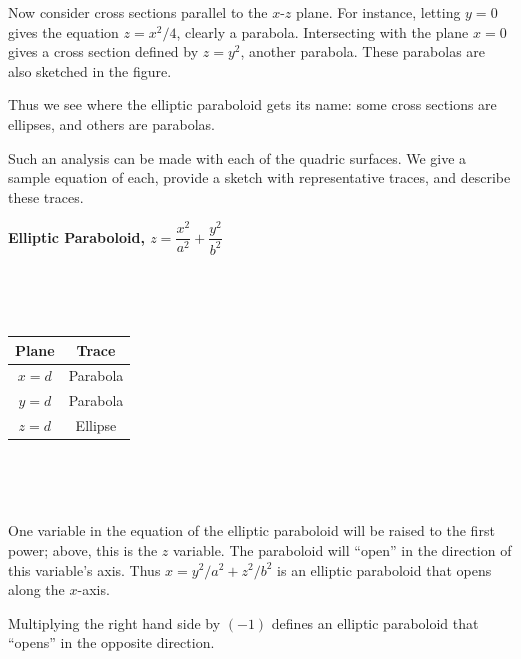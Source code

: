 Now consider cross sections parallel to the $x$-$z$ plane. For instance, letting $y=0$ gives the equation $z=x^2/4$, clearly a parabola. Intersecting with the plane $x=0$ gives a cross section defined by $z=y^2$, another parabola. These parabolas are also sketched in the figure. 

Thus we see where the elliptic paraboloid gets its name: some cross sections are ellipses, and others are parabolas. 

Such an analysis can be made with each of the quadric surfaces. We give a sample equation of each, provide a sketch with representative traces, and describe these traces.

\clearpage
\exercisegeometry\exerciseheader

\noindent \textbf{Elliptic Paraboloid, \quad$z=\dfrac{x^2}{a^2}+\dfrac{y^2}{b^2}$}\bigskip\\
\begin{minipage}{1.1\linewidth}
 \noindent%
 \begin{minipage}[c]{.35\linewidth}
  \mbox{}\\
 \end{minipage}%
 \begin{minipage}[c]{.2\linewidth}
  \mbox{}\\
  \begin{tabular}{cc}
   \textbf{Plane}  & \textbf{Trace} \\\midrule
   $x=d$ & Parabola \\
   $y=d$ & Parabola \\
   $z=d$ & Ellipse
  \end{tabular}
 \end{minipage}%
 \begin{minipage}[c]{.45\linewidth}
  \mbox{}\\
 \end{minipage}
 \bigskip\\
 \begin{minipage}{.75\linewidth}
  One variable in the equation of the elliptic paraboloid will be raised to the first power; above, this is the $z$ variable. The paraboloid will ``open'' in the direction of this variable's axis. Thus $x= y^2/a^2+z^2/b^2$ is an elliptic paraboloid that opens along the $x$-axis.\bigskip

  Multiplying the right hand side by $(-1)$ defines an elliptic paraboloid that ``opens'' in the opposite direction.
 \end{minipage}
\end{minipage}

